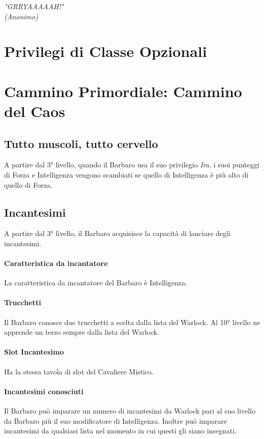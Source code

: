 
\begin{DndReadAloud}
    \it
    "GRRYAAAAAH!" \\ (Anonimo)
  \end{DndReadAloud}

\section{Privilegi di Classe Opzionali}

\section{Cammino Primordiale: Cammino del Caos}

\subsection{Tutto muscoli, tutto cervello}
A partire dal 3° livello, quando il Barbaro usa il suo privilegio \textit{Ira}, i suoi punteggi di Forza e Intelligenza vengono scambiati se quello di Intelligenza è più alto di quello di Forza.

\subsection{Incantesimi}
A partire dal 3° livello, il Barbaro acquisisce la capacità di lanciare degli incantesimi.
\paragraph{Caratteristica da incantatore} La caratteristica da incantatore del Barbaro è Intelligenza.
\paragraph{Trucchetti} Il Barbaro conosce due trucchetti a scelta dalla lista del Warlock. Al 10° livello ne apprende un terzo sempre dalla lista del Warlock.
\paragraph{Slot Incantesimo} Ha la stessa tavola di slot del Cavaliere Mistico.
\paragraph{Incantesimi conosciuti} Il Barbaro può imparare un numero di incantesimi da Warlock pari al suo livello da Barbaro più il suo modificatore di Intelligenza. Inoltre può imparare incantesimi da qualsiasi lista nel momento in cui questi gli siano insegnati.

